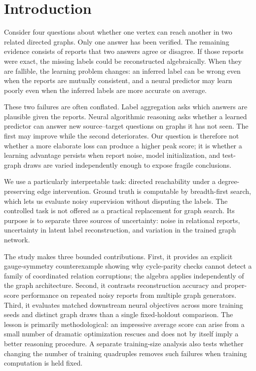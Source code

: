 \documentclass[10pt]{article}
\begin{document}
\section{Introduction}
Consider four questions about whether one vertex can reach another in two related directed graphs. Only one answer has been verified. The remaining evidence consists of reports that two answers agree or disagree. If those reports were exact, the missing labels could be reconstructed algebraically. When they are fallible, the learning problem changes: an inferred label can be wrong even when the reports are mutually consistent, and a neural predictor may learn poorly even when the inferred labels are more accurate on average.

These two failures are often conflated. Label aggregation asks which answers are plausible given the reports. Neural algorithmic reasoning asks whether a learned predictor can answer new source--target questions on graphs it has not seen. The first may improve while the second deteriorates. Our question is therefore not whether a more elaborate loss can produce a higher peak score; it is whether a learning advantage persists when report noise, model initialization, and test-graph draws are varied independently enough to expose fragile conclusions.

We use a particularly interpretable task: directed reachability under a degree-preserving edge intervention. Ground truth is computable by breadth-first search, which lets us evaluate noisy supervision without disputing the labels. The controlled task is not offered as a practical replacement for graph search. Its purpose is to separate three sources of uncertainty: noise in relational reports, uncertainty in latent label reconstruction, and variation in the trained graph network.

The study makes three bounded contributions. First, it provides an explicit gauge-symmetry counterexample showing why cycle-parity checks cannot detect a family of coordinated relation corruptions; the algebra applies independently of the graph architecture. Second, it contrasts reconstruction accuracy and proper-score performance on repeated noisy reports from multiple graph generators. Third, it evaluates matched downstream neural objectives across more training seeds and distinct graph draws than a single fixed-holdout comparison. The lesson is primarily methodological: an impressive average score can arise from a small number of dramatic optimization rescues and does not by itself imply a better reasoning procedure. A separate training-size analysis also tests whether changing the number of training quadruples removes such failures when training computation is held fixed.
\end{document}
